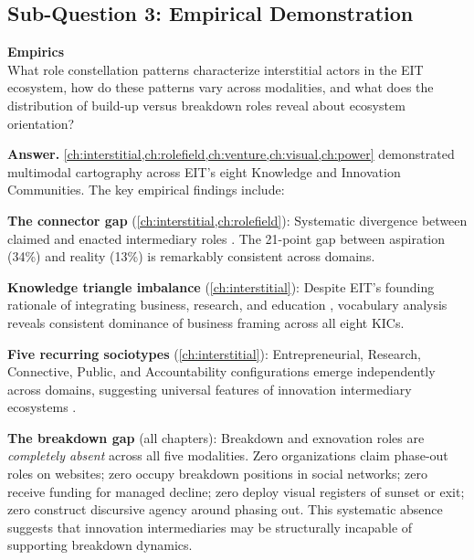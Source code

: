 \documentclass[../main.tex]{subfiles}
\begin{document}
\subsection{Sub-Question 3: Empirical Demonstration}

\begin{subrq}
\textbf{Empirics}\\
What role constellation patterns characterize interstitial actors in the EIT ecosystem, how do these patterns vary across modalities, and what does the distribution of build-up versus breakdown roles reveal about ecosystem orientation?
\end{subrq}

\noindent\textbf{Answer.} \cref{ch:interstitial,ch:rolefield,ch:venture,ch:visual,ch:power} demonstrated multimodal cartography across EIT's eight Knowledge and Innovation Communities. The key empirical findings include:

\textbf{The connector gap} (\cref{ch:interstitial,ch:rolefield}): Systematic divergence between claimed and enacted intermediary roles \cite{kivimaa2019innovation,howells2006intermediation}. The 21-point gap between aspiration (34\%) and reality (13\%) is remarkably consistent across domains.

\textbf{Knowledge triangle imbalance} (\cref{ch:interstitial}): Despite EIT's founding rationale of integrating business, research, and education \cite{etzkowitz2000dynamics,carayannis2009mode}, vocabulary analysis reveals consistent dominance of business framing across all eight KICs.

\textbf{Five recurring sociotypes} (\cref{ch:interstitial}): Entrepreneurial, Research, Connective, Public, and Accountability configurations emerge independently across domains, suggesting universal features of innovation intermediary ecosystems \cite{adner2017ecosystem,jacobides2018ecosystems}.

\textbf{The breakdown gap} (all chapters): Breakdown and exnovation roles are \emph{completely absent} across all five modalities. Zero organizations claim phase-out roles on websites; zero occupy breakdown positions in social networks; zero receive funding for managed decline; zero deploy visual registers of sunset or exit; zero construct discursive agency around phasing out. This systematic absence suggests that innovation intermediaries may be structurally incapable of supporting breakdown dynamics.
\end{document}
